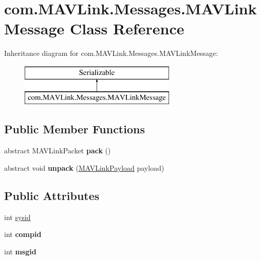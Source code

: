 \hypertarget{classcom_1_1MAVLink_1_1Messages_1_1MAVLinkMessage}{}\section{com.\+M\+A\+V\+Link.\+Messages.\+M\+A\+V\+Link\+Message Class Reference}
\label{classcom_1_1MAVLink_1_1Messages_1_1MAVLinkMessage}
Inheritance diagram for com.\+M\+A\+V\+Link.\+Messages.\+M\+A\+V\+Link\+Message\+:\begin{figure}[H]
\begin{center}
\leavevmode
\includegraphics[height=2.000000cm]{classcom_1_1MAVLink_1_1Messages_1_1MAVLinkMessage}
\end{center}
\end{figure}
\subsection*{Public Member Functions}
\begin{DoxyCompactItemize}
\item 
\mbox{\label{classcom_1_1MAVLink_1_1Messages_1_1MAVLinkMessage_af25705beb4ae8d8ad2f274202ed4fe6e}} 
abstract M\+A\+V\+Link\+Packet {\bfseries pack} ()
\item 
\mbox{\label{classcom_1_1MAVLink_1_1Messages_1_1MAVLinkMessage_a323793ff4d45acc7c8e5430d92265156}} 
abstract void {\bfseries unpack} (\hyperlink{classcom_1_1MAVLink_1_1Messages_1_1MAVLinkPayload}{M\+A\+V\+Link\+Payload} payload)
\end{DoxyCompactItemize}
\subsection*{Public Attributes}
\begin{DoxyCompactItemize}
\item 
int \hyperlink{classcom_1_1MAVLink_1_1Messages_1_1MAVLinkMessage_addeab3d19c1a864d569978302031792a}{sysid}
\item 
\mbox{\label{classcom_1_1MAVLink_1_1Messages_1_1MAVLinkMessage_a3cc56234000b2fa3e1cd488211e611a0}} 
int {\bfseries compid}
\item 
\mbox{\label{classcom_1_1MAVLink_1_1Messages_1_1MAVLinkMessage_a552595198ab3909eacacfe1a95e10325}} 
int {\bfseries msgid}
\end{DoxyCompactItemize}


